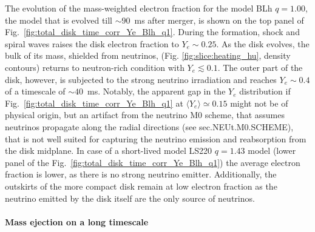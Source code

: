 \documentclass[11pt,a4paper,headinclude=true,DIV=14,BCOR=8mm,chapterprefix,listof=totoc,twoside,openright,abstracton]{scrbook}
\begin{document}
The evolution of the mass-weighted electron fraction for the model
BLh $q=1.00$, the model that is evolved till $\sim 90$~ms after merger, 
is shown on the top panel of Fig.~\ref{fig:total_disk_time_corr_Ye_Blh_q1}.
During the formation, shock and spiral waves raises the disk electron fraction to
$Y_e\sim0.25$. As the disk evolves, the bulk of its mass, shielded from neutrinos, 
(Fig. \ref{fig:slice:heating_hu}, density contours) 
returns to neutron-rich condition with $Y_e\lesssim0.1$. 
The outer part of the disk, however, is subjected to the 
strong neutrino irradiation and reaches $Y_e\sim0.4$ of a timescale of ${\sim}40$~ms.
Notably, the apparent gap in the $Y_e$ distribution if Fig.~\ref{fig:total_disk_time_corr_Ye_Blh_q1} at $\langle Y_e \rangle \simeq 0.15$ 
might not be of physical origin, but an artifact from the neutrino M0 scheme, 
that assumes neutrinos propagate along the radial directions
(see sec.NEUt.M0.SCHEME), that is not well suited for capturing the 
neutrino emission and reabsorption from the disk midplane.
In case of a short-lived model LS220 $q=1.43$ model 
(lower panel of the Fig.~\ref{fig:total_disk_time_corr_Ye_Blh_q1})
the average electron fraction is lower, as there is no strong neutrino 
emitter. Additionally, the outskirts of the more compact disk remain 
at low electron fraction as the neutrino emitted by the disk itself 
are the only source of neutrinos. 

\paragraph{Mass ejection on a long timescale}
\end{document}

